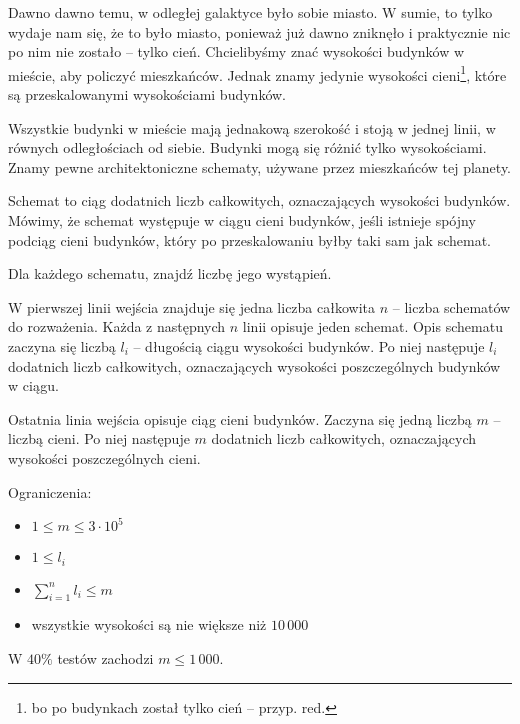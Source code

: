 

\usepackage[utf8]{inputenc}
\usepackage[T1]{fontenc}
\usepackage[polish]{babel}
\usepackage{polski}





Dawno dawno temu, w odległej galaktyce było sobie miasto.
W sumie, to tylko wydaje nam się, że to było miasto,
	ponieważ już dawno zniknęło i praktycznie nic po nim nie zostało -- tylko cień.
Chcielibyśmy znać wysokości budynków w mieście, aby policzyć mieszkańców.
Jednak znamy jedynie wysokości cieni\footnote{bo po budynkach został tylko cień -- przyp. red.},
	które są przeskalowanymi wysokościami budynków.


Wszystkie budynki w mieście mają jednakową szerokość i stoją w jednej linii, w równych odległościach od siebie.
Budynki mogą się różnić tylko wysokościami.
Znamy pewne architektoniczne schematy, używane przez mieszkańców tej planety.

Schemat to ciąg dodatnich liczb całkowitych, oznaczających wysokości budynków.
Mówimy, że schemat występuje w ciągu cieni budynków, jeśli istnieje spójny podciąg cieni budynków,
	który po przeskalowaniu byłby taki sam jak schemat.

Dla każdego schematu, znajdź liczbę jego wystąpień.


W pierwszej linii wejścia znajduje się jedna liczba całkowita $n$ -- liczba schematów do rozważenia.
Każda z następnych $n$ linii opisuje jeden schemat.
Opis schematu zaczyna się liczbą $l_i$ -- długością ciągu wysokości budynków.
Po niej następuje $l_i$ dodatnich liczb całkowitych, oznaczających wysokości poszczególnych budynków w ciągu.

Ostatnia linia wejścia opisuje ciąg cieni budynków.
Zaczyna się jedną liczbą $m$ -- liczbą cieni.
Po niej następuje $m$ dodatnich liczb całkowitych, oznaczających wysokości poszczególnych cieni.

Ograniczenia:
\begin{itemize}
	\item $1 \le m \le 3 \cdot 10^5$
	\item $1 \le l_i$
	\item $\sum_{i = 1}^n l_i \le m$
	\item wszystkie wysokości są nie większe niż $10\,000$
\end{itemize}
W $40\%$ testów zachodzi $m \le 1\,000$.

